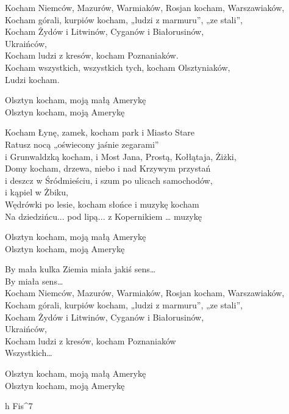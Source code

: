 \begin{textn}

    Kocham Niemców, Mazurów, Warmiaków, Rosjan kocham, Warszawiaków,\\
    Kocham górali, kurpiów kocham, „ludzi z marmuru”, „ze stali”,\\
    Kocham Żydów i Litwinów, Cyganów i Białorusinów,\\
    Ukraińców,\\
    Kocham ludzi z kresów, kocham Poznaniaków.\\
    Kocham wszystkich, wszystkich tych, kocham Olsztyniaków,\\
    Ludzi kocham.

    Olsztyn kocham, moją małą Amerykę\\
    Olsztyn kocham, moją Amerykę

    Kocham Łynę, zamek, kocham park i Miasto Stare\\
    Ratusz nocą „oświecony jaśnie zegarami”\\
    i Grunwaldzką kocham, i Most Jana, Prostą, Kołłątaja, Żiżki,\\
    Domy kocham, drzewa, niebo i nad Krzywym przystań\\
    i deszcz w Śródmieściu, i szum po ulicach samochodów,\\
    i kąpiel w Żbiku,\\
    Wędrówki po lesie, kocham słońce i muzykę kocham\\
    Na dziedzińcu... pod lipą... z Kopernikiem … muzykę

    Olsztyn kocham, moją małą Amerykę\\
    Olsztyn kocham, moją Amerykę

    By mała kulka Ziemia miała jakiś sens…\\
    By miała sens…\\
    Kocham Niemców, Mazurów, Warmiaków, Rosjan kocham, Warszawiaków,\\
    Kocham górali, kurpiów kocham, „ludzi z marmuru”, „ze stali”,\\
    Kocham Żydów i Litwinów, Cyganów i Białorusinów,\\
    Ukraińców,\\
    Kocham ludzi z kresów, kocham Poznaniaków\\
    Wszystkich…

    Olsztyn kocham, moją małą Amerykę\\
    Olsztyn kocham, moją Amerykę
    
\end{textn}
\begin{chord}
    \footnotesize{
    h Fis^7
    }
\end{chord}